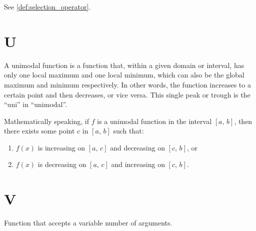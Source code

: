     \begin{definition}[Selector]
      See \vref{def:selection_operator}.
    \end{definition}

  \section*{U}
    \begin{definition}
    \label{def:unimodal_function}
      A unimodal function is a function that, within a given domain or interval,
      has only one local maximum and one local minimum, which can also be the
      global maximum and minimum respectively.
      In other words, the function increases to a certain point and then 
      decreases, or vice versa.
      This single peak or trough is the \enquote{uni} in \enquote{unimodal}.

      Mathematically speaking, if \(f\) is a unimodal function in the interval 
      \([a,\, b]\), then there exists some point \(c\) in \([a,\, b]\) such 
      that:

      \begin{enumerate}
        \item \(f(x)\) is increasing on \([a,\, c]\) and decreasing on \([c,\, 
          b]\), or
        \item \(f(x)\) is decreasing on \([a,\, c]\) and increasing on \([c,\,
          b]\).
      \end{enumerate}
    \end{definition}

  \section*{V}
    \begin{definition}
    \label{def:variadic_function}
      Function that accepts a variable number of arguments.
    \end{definition}
